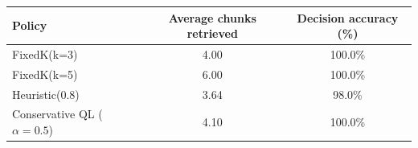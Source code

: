 \begin{tabular}{lcc}
  \toprule
  Policy & Average chunks retrieved & Decision accuracy (\%) \\
  \midrule
  FixedK(k=3) & 4.00 & 100.0\% \\
  FixedK(k=5) & 6.00 & 100.0\% \\
  Heuristic(0.8) & 3.64 & 98.0\% \\
  Conservative QL ($\alpha=0.5$) & 4.10 & 100.0\% \\
  \bottomrule
\end{tabular}